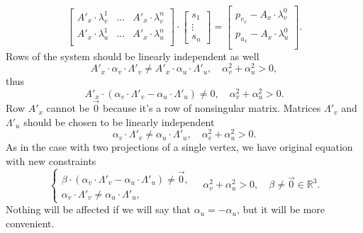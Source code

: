 \begin{equation*}
  \begin{bmatrix}
    A'_x \cdot \lambda^1_v & \dots & A'_x \cdot \lambda^n_v \\
    A'_x \cdot \lambda^1_u & \dots & A'_x \cdot \lambda^n_u \\
  \end{bmatrix}
  \cdot \begin{bmatrix}
    s_1 \\
    \vdots \\
    s_n
  \end{bmatrix}
  = \begin{bmatrix}
    p_{v_x} - A_x \cdot \lambda^0_v \\
    p_{u_x} - A_x \cdot \lambda^0_u \\
  \end{bmatrix}.
\end{equation*}
Rows of the system should be linearly independent as well
\begin{equation*}
  A'_x \cdot \alpha_v \cdot \Lambda'_v
  \neq A'_x \cdot \alpha_u \cdot \Lambda'_u,
  \quad \alpha_v^2 + \alpha_u^2 > 0,
\end{equation*}
thus
\begin{equation*}
  A'_x \cdot \left( \alpha_v \cdot \Lambda'_v
                  - \alpha_u \cdot \Lambda'_u \right)
    \neq 0,
  \quad \alpha_v^2 + \alpha_u^2 > 0.
\end{equation*}
Row $A'_x$ cannot be $\vec{0}$ because it's a row of nonsingular matrix.
Matrices $\Lambda'_v$ and $\Lambda'_u$
should be chosen to be linearly independent
\begin{equation*}
  \alpha_v \cdot \Lambda'_v \neq \alpha_u \cdot \Lambda'_u,
  \quad \alpha_v^2 + \alpha_u^2 > 0.
\end{equation*}
As in the case with two projections of a single vertex,
we have original equation with new constraints
\begin{equation*}
  \begin{cases}
    \beta \cdot \left( \alpha_v \cdot \Lambda'_v
                     - \alpha_u \cdot \Lambda'_u \right)
    \neq \vec{0}, \\
    \alpha_v \cdot \Lambda'_v \neq \alpha_u \cdot \Lambda'_u,
  \end{cases}
  \quad \alpha_v^2 + \alpha_u^2 > 0,
  \quad \beta \neq \vec{0} \in \mathbb{R}^3.
\end{equation*}
Nothing will be affected if we will say that $\alpha_u = - \alpha_u$,
but it will be more convenient.
